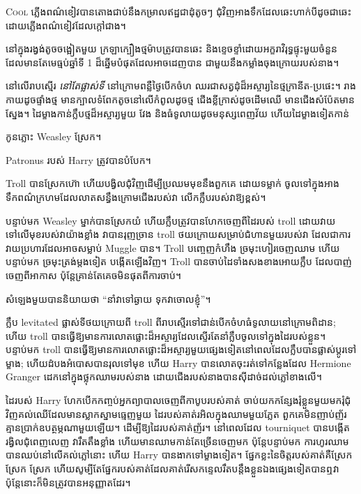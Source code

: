 
\lettrine{C}{ool} ភ្លើងពណ៌ខៀវបានតោងជាប់នឹងកម្រាលឥដ្ឋជាដុំតូចៗ ជុំវិញអាងទឹកដែលឆេះហាក់បីដូចជាឆេះដោយភ្លើងពណ៌ខៀវដែលក្តៅជាង។

នៅក្នុងរង្វង់តូចចង្អៀតមួយ ក្រឡាក្បឿងថ្មម៉ាបត្រូវបានឆេះ និងខ្ទេចខ្ទាំដោយអក្ខរាវិរុទ្ធផ្ទុះមួយចំនួន ដែលមានតែមេធ្មប់ឆ្នាំទី 1 ដ៏ឆ្នើមបំផុតដែលអាចដេញបាន ជាមួយនឹងកម្លាំងចុងក្រោយរបស់នាង។

នៅលើរាបស្មើរ \emph{នៅតែផ្លាស់ទី} នៅក្រោមពន្លឺថ្ងៃបើកចំហ ឈរជាសត្វដុំដ៏អស្ចារ្យនៃថ្មក្រានីត-ប្រផេះ។ រាងកាយ​ដូច​ផ្ទាំង​ថ្ម មាន​ក្បាល​ទំពែក​តូច​នៅ​លើ​កំពូល​ដូច​ថ្ម ជើង​ខ្លី​ក្រាស់​ដូច​ដើម​ឈើ មាន​ជើង​សំប៉ែត​មាន​ស្នែង។ ដៃម្ខាងកាន់ក្លឹបថ្មដ៏អស្ចារ្យមួយ វែង និងធំទូលាយដូចមនុស្សពេញវ័យ ហើយដៃម្ខាងទៀតកាន់

កូនភ្លោះ Weasley ស្រែក។

Patronus របស់ Harry ត្រូវបានបំបែក។

Troll បានស្រែកហ៊ោ ហើយបង្វិលជុំវិញដើម្បីប្រឈមមុខនឹងពួកគេ ដោយទម្លាក់  ចូលទៅក្នុងអាងទឹកពណ៌ក្រហមដែលលាតសន្ធឹងក្រោមជើងរបស់វា លើកក្លឹបរបស់វាឱ្យខ្ពស់។

បន្ទាប់មក Weasley ម្នាក់បានស្រែកយំ ហើយក្លឹបត្រូវបានហែកចេញពីដៃរបស់ troll ដោយវាយទៅលើមុខរបស់វាយ៉ាងខ្លាំង វាបានរុញច្រាន troll ថយក្រោយសម្រាប់ជំហានមួយរបស់វា ដែលជាការវាយប្រហារដែលអាចសម្លាប់ Muggle បាន។ Troll បញ្ចេញកំហឹង ច្រមុះហៀរចេញឈាម ហើយបន្ទាប់មក ច្រមុះត្រង់ម្តងទៀត បង្កើតឡើងវិញ។ Troll បានចាប់ដៃទាំងសងខាងអោយក្លឹប ដែលបាញ់ចេញពីអាកាស ប៉ុន្តែគ្រាន់តែគេចមិនផុតពីការចាប់។

សំឡេង​មួយ​បាន​និយាយ​ថា “នាំ​វា​ទៅ​ឆ្ងាយ ទុក​វា​ចោល​ខ្ញុំ”។

ក្លឹប levitated ផ្លាស់ទីថយក្រោយពី troll ពីរាបស្មើរទៅជាន់បើកចំហធំទូលាយនៅក្រោមពិដាន; ហើយ troll បានធ្វើឱ្យមានការលោតផ្លោះដ៏អស្ចារ្យដែលស្ទើរតែនាំក្លឹបចូលទៅក្នុងដៃរបស់ខ្លួន។ បន្ទាប់មក troll បានធ្វើឱ្យមានការលោតផ្លោះដ៏អស្ចារ្យមួយផ្សេងទៀតនៅពេលដែលក្លឹបបានផ្លាស់ប្តូរទៅម្ខាង; ហើយដំបងអំបោសបានរុលទៅមុខ ហើយ Harry បានលោតចុះរត់ទៅកន្លែងដែល Hermione Granger ដេកនៅក្នុងថ្លុកឈាមរបស់នាង ដោយជើងរបស់នាងបានស៊ីដាច់ដល់ភ្លៅខាងលើ។

ដៃរបស់ Harry ហែកបើកកញ្ចប់អ្នកព្យាបាលចេញពីកាបូបរបស់គាត់ ចាប់យកកន្សែងរុំខ្លួនមួយមករុំជុំវិញគល់ឈើដែលមានស្លាកស្នាមធ្មេញមួយ ដៃរបស់គាត់រអិលក្នុងឈាមមួយភ្លែត ពួកគេមិនញាប់ញ័រ គ្មានប្រាក់ឧបត្ថម្ភណាមួយឡើយ។ ដើម្បីឱ្យដៃរបស់គាត់ញ័រ។ នៅពេលដែល tourniquet បានបង្កើតរង្វិលជុំពេញលេញ វារឹតតឹងខ្លាំង ហើយមានឈាមកាន់តែច្រើនចេញមក ប៉ុន្តែបន្ទាប់មក ការហូរឈាមបានឈប់នៅលើគល់ភ្លៅនោះ ហើយ Harry បានងាកទៅម្ខាងទៀត។ ផ្នែកខ្លះនៃចិត្តរបស់គាត់គឺស្រែក ស្រែក ស្រែក ហើយសូម្បីតែផ្នែករបស់គាត់ដែលគាត់រើសកន្ទេលរឹតបន្តឹងខ្លួនឯងផ្សេងទៀតបានឮវា ប៉ុន្តែនោះក៏មិនត្រូវបានអនុញ្ញាតដែរ។

